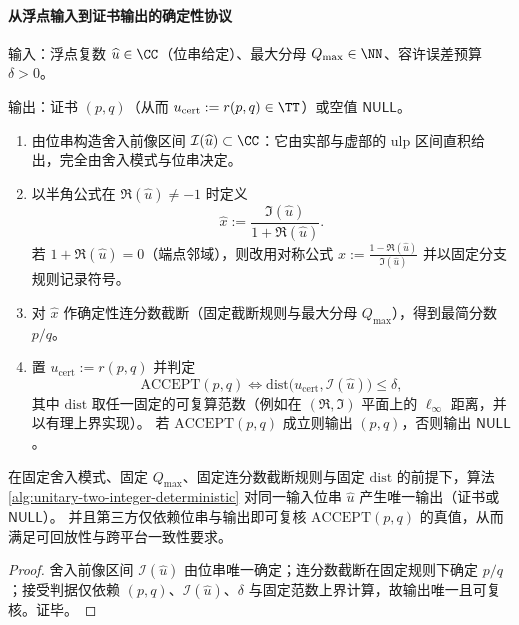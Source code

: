 \paragraph{从浮点输入到证书输出的确定性协议}
\begin{algorithm}\label{alg:unitary-two-integer-deterministic}
输入：浮点复数 \(\widehat u\in\CC\)（位串给定）、最大分母 \(Q_{\max}\in\NN\)、容许误差预算 \(\delta>0\)。

\smallskip
\noindent 输出：证书 \((p,q)\)（从而 \(u_{\mathrm{cert}}:=r(p,q)\in\TT\)）或空值 \(\mathsf{NULL}\)。
\begin{enumerate}
  \item 由位串构造舍入前像区间 \(\mathcal{I}(\widehat u)\subset\CC\)：它由实部与虚部的 ulp 区间直积给出，完全由舍入模式与位串决定。
  \item 以半角公式在 \(\Re(\widehat u)\neq-1\) 时定义
  \[
  \widehat x:=\frac{\Im(\widehat u)}{1+\Re(\widehat u)}.
  \]
  若 \(1+\Re(\widehat u)=0\)（端点邻域），则改用对称公式
  \(
  \widehat x:=\frac{1-\Re(\widehat u)}{\Im(\widehat u)}
  \)
  并以固定分支规则记录符号。
  \item 对 \(\widehat x\) 作确定性连分数截断（固定截断规则与最大分母 \(Q_{\max}\)），得到最简分数 \(p/q\)。
  \item 置 \(u_{\mathrm{cert}}:=r(p,q)\) 并判定
  \[
  \mathrm{ACCEPT}(p,q)\Longleftrightarrow
  \mathrm{dist}\bigl(u_{\mathrm{cert}},\mathcal{I}(\widehat u)\bigr)\le\delta,
  \]
  其中 \(\mathrm{dist}\) 取任一固定的可复算范数（例如在 \((\Re,\Im)\) 平面上的 \(\ell_{\infty}\) 距离，并以有理上界实现）。
  若 \(\mathrm{ACCEPT}(p,q)\) 成立则输出 \((p,q)\)，否则输出 \(\mathsf{NULL}\)。
\end{enumerate}
\end{algorithm}

\begin{proposition}\label{prop:unitary-two-integer-reproducible}
在固定舍入模式、固定 \(Q_{\max}\)、固定连分数截断规则与固定 \(\mathrm{dist}\) 的前提下，算法 \ref{alg:unitary-two-integer-deterministic} 对同一输入位串 \(\widehat u\) 产生唯一输出（证书或 \(\mathsf{NULL}\)）。
并且第三方仅依赖位串与输出即可复核 \(\mathrm{ACCEPT}(p,q)\) 的真值，从而满足可回放性与跨平台一致性要求。
\end{proposition}
\begin{proof}
舍入前像区间 \(\mathcal{I}(\widehat u)\) 由位串唯一确定；连分数截断在固定规则下确定 \(p/q\)；接受判据仅依赖 \((p,q)\)、\(\mathcal{I}(\widehat u)\)、\(\delta\) 与固定范数上界计算，故输出唯一且可复核。证毕。
\end{proof}
